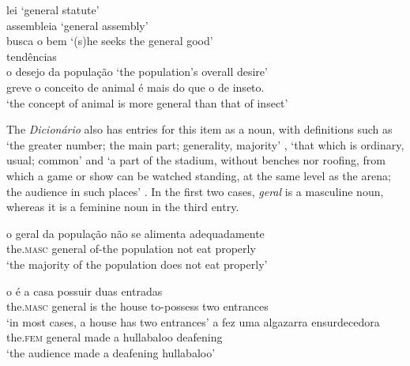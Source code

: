 \documentclass[output=paper]{langscibook}
\begin{document}
\ea\label{ex:avelar:2}
 \ea\label{ex:avelar:2a}
    {lei {}} \hspace{3,3cm} ‘general statute’\\
    {assembleia {}} \hspace{2,1cm}‘general assembly’\\
    {busca o bem } \hspace{1,88cm}‘(s)he seeks the general good’\\
  \ex\label{ex:avelar:2b} 
    {{tendências}} {}{ }\hspace{1,99cm}{‘overall tendencies’}\\
    {o desejo} {}{ {da população}}\hspace{0.5cm} {‘the population’s overall desire’}\\
    {greve} {}{ }\hspace{3cm}{‘general/mass strike’}
  \ex\label{ex:avelar:2c}
    o conceito   de animal   é   mais {}{ {do que o de inseto.}}\\ {‘the concept   of animal   is   more general   than that of insect’}
\z 
\z


The \textit{Dicionário} also has entries for this item as a noun, with definitions such as ‘the greater number; the main part; generality, majority’ , ‘that which is ordinary, usual; common’  and ‘a part of the stadium, without benches nor roofing, from which a game or show can be watched standing, at the same level as the arena; the audience in such places’ . In the first two cases, \textit{geral} is a masculine noun, whereas it is a feminine noun in the third entry.

\ea\label{ex:avelar:3} 
 \ea\label{ex:avelar:3a}
  \gll o {\ExHighlight geral} da população não {se alimenta}  adequadamente\\
         {the.\textsc{masc} general of-the population not eat properly}\\
  \glt ‘the majority of the population does not eat properly’

 \ex\label{ex:avelar:3b} 
  \gll o  é a casa possuir duas entradas\\
         the.\textsc{masc} general   is the house   to-possess   two   entrances\\
  \glt ‘in most cases, a house has two entrances’
 \ex\label{ex:avelar:3c} 
  \gll a {} fez     uma   algazarra     ensurdecedora\\
         the.\textsc{fem} general   made   a     hullabaloo   deafening\\
  \glt ‘the audience made a deafening hullabaloo’
\z
\z
\end{document}
